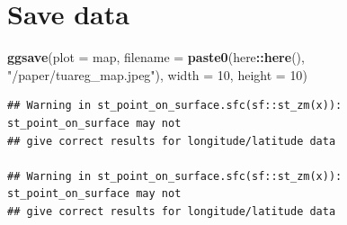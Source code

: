 \documentclass[
]{article}
\newenvironment{Shaded}{\begin{snugshade}}{\end{snugshade}}
\newcommand{\DataTypeTok}[1]{\textcolor[rgb]{0.13,0.29,0.53}{#1}}
\newcommand{\DecValTok}[1]{\textcolor[rgb]{0.00,0.00,0.81}{#1}}
\newcommand{\KeywordTok}[1]{\textcolor[rgb]{0.13,0.29,0.53}{\textbf{#1}}}
\newcommand{\NormalTok}[1]{#1}
\newcommand{\OperatorTok}[1]{\textcolor[rgb]{0.81,0.36,0.00}{\textbf{#1}}}
\newcommand{\StringTok}[1]{\textcolor[rgb]{0.31,0.60,0.02}{#1}}
\begin{document}
\hypertarget{save-data}{%
\section{Save data}\label{save-data}}

\begin{Shaded}
\begin{Highlighting}[]
\KeywordTok{ggsave}\NormalTok{(}\DataTypeTok{plot =}\NormalTok{ map, }\DataTypeTok{filename =} \KeywordTok{paste0}\NormalTok{(here}\OperatorTok{::}\KeywordTok{here}\NormalTok{(), }\StringTok{"/paper/tuareg_map.jpeg"}\NormalTok{), }\DataTypeTok{width =} \DecValTok{10}\NormalTok{, }\DataTypeTok{height =} \DecValTok{10}\NormalTok{)}
\end{Highlighting}
\end{Shaded}

\begin{verbatim}
## Warning in st_point_on_surface.sfc(sf::st_zm(x)): st_point_on_surface may not
## give correct results for longitude/latitude data

## Warning in st_point_on_surface.sfc(sf::st_zm(x)): st_point_on_surface may not
## give correct results for longitude/latitude data
\end{verbatim}
\end{document}
